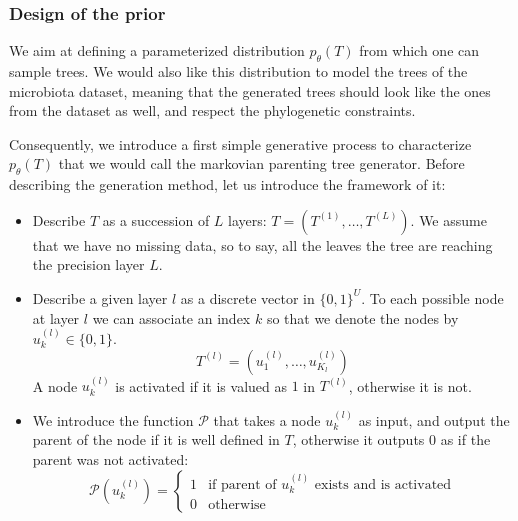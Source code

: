 \subsubsection{Design of the prior}


We aim at defining a parameterized distribution $p_{\theta}(T)$ from which one can sample trees.
We would also like this distribution to model the trees of the microbiota dataset, meaning that
the generated trees should look like the ones from the dataset as well, and respect the phylogenetic constraints. \\

\newcommand{\nodeparent}{\mathcal{P}}

Consequently, we introduce a first simple generative process to characterize $p_{\theta}(T)$ that we would call the markovian parenting tree generator.
Before describing the generation method, let us introduce the framework of it:
\begin{itemize}
    \item Describe $T$ as a succession of $L$ layers: $T = (T^{(1)}, \dots, T^{(L)})$.
    We assume that we have no missing data, so to say, all the leaves the tree are reaching the precision layer $L$.
    \item Describe a given layer $l$ as a discrete vector in $\{0, 1\}^{U}$.
    To each possible node at layer $l$ we can associate an index $k$ so that we denote the nodes by $u_k^{(l)} \in \{0, 1\}$.
    $$T^{(l)} = (u_1^{(l)}, \dots, u_{K_l}^{(l)})$$
    A node $u_k^{(l)}$ is activated if it is valued as $1$ in $T^{(l)}$, otherwise it is not.
    \item We introduce the function $\nodeparent$ that takes a node $u_k^{(l)}$ as input, and output the parent of the node if it is well defined in $T$,
          otherwise it outputs $0$ as if the parent was not activated:
            $$
            \nodeparent(u_k^{(l)}) = \left\{
            \begin{array}{ll}
                1 & \mbox{if } \text{parent of $u_k^{(l)}$ exists and is activated}\\
                0 & \mbox{otherwise}
            \end{array}
            \right.
            $$
\end{itemize}

